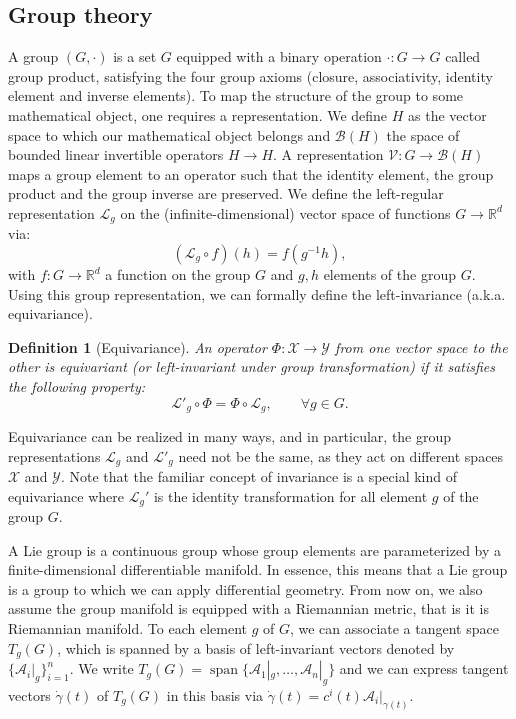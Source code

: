 \documentclass{article}
\newtheorem{definition}{Definition}[section]
\DeclareMathOperator{\spn}{span}
\begin{document}
\subsection{Group theory} \label{app:group_theory}

A group $(G, \cdot)$ is a set $G$ equipped with a binary operation $\cdot : G \to G$ called group product, satisfying the four group axioms (closure, associativity, identity element and inverse elements). To map the structure of the group to some mathematical object, one requires a representation. We define $H$ as the vector space to which our mathematical object belongs and $\mathcal{B}(H)$ the space of bounded linear invertible operators $H \to H$. A representation $\mathcal{V} : G \to \mathcal{B}(H)$ maps a group element to an operator such that the identity element, the group product and the group inverse are preserved. We define the left-regular representation $\mathcal{L}_g$ on the (infinite-dimensional) vector space of functions $G \to \mathbb{R}^d$ via:
\begin{equation}
(\mathcal{L}_g \circ f )(h) = f(g^{-1}h),
\end{equation}
with $f : G \to \mathbb{R}^d$ a function on the group $G$ and $g, h$ elements of the group $G$. Using this group representation, we can formally define the left-invariance (a.k.a. equivariance).

\begin{definition}[Equivariance] \label{def:equivariance}
An operator $\Phi : \mathcal{X} \to \mathcal{Y}$ from one vector space to the other is equivariant (or left-invariant under group transformation) if it satisfies the following property:
\begin{equation}
\mathcal{L}'_g \circ \Phi = \Phi \circ \mathcal{L}_g, \qquad \forall g \in G.
\end{equation}
\end{definition}

Equivariance can be realized in many ways, and in particular, the group representations $\mathcal{L}_g$ and $\mathcal{L}'_g$ need not be the same, as they act on different spaces $\mathcal{X}$ and $\mathcal{Y}$. Note that the familiar concept of invariance is a special kind of equivariance where  $\mathcal{L}_g'$ is the identity transformation for all element $g$ of the group $G$.


A Lie group is a continuous group whose group elements are parameterized by a finite-dimensional differentiable manifold. In essence, this means that a Lie group is a group to which we can apply differential geometry. From now on, we also assume the group manifold is equipped with a Riemannian metric, that is it is Riemannian manifold. To each element $g$ of $G$, we can associate a tangent space $T_g(G)$, which is spanned by a basis of left-invariant vectors denoted by $\{\mathcal{A}_i|_g\}_{i=1}^n$. We write $T_g(G) = \spn\{\mathcal{A}_1|_g, \dots, \mathcal{A}_n|_g\}$ and we can express tangent vectors $\dot{\gamma}(t)$ of $T_g(G)$ in this basis via $\dot{\gamma}(t) = c^i(t) \mathcal{A}_i|_{\gamma(t)}$.
\end{document}
